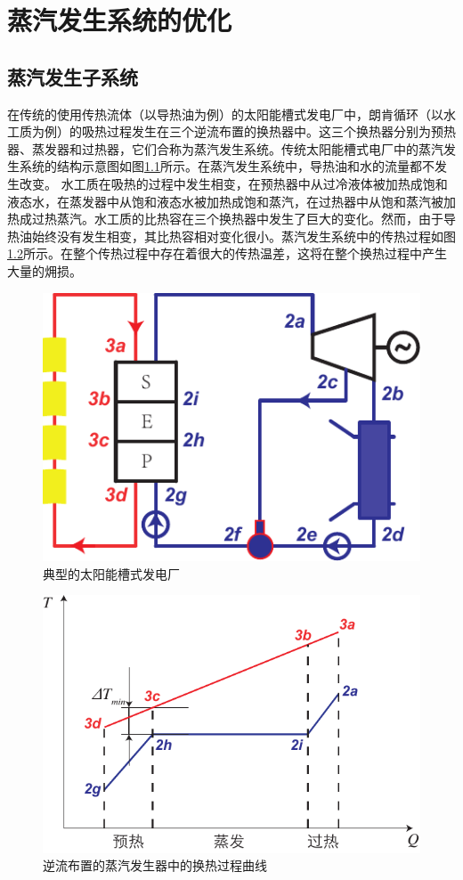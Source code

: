 \chapter{蒸汽发生系统的优化}
\label{cha:osgs}
\section{蒸汽发生子系统}

在传统的使用传热流体（以导热油为例）的太阳能槽式发电厂中，朗肯循环（以水工质为例）的吸热过程发生在三个逆流布置的换热器中。这三个换热器分别为预热器、蒸发器和过热器，它们合称为蒸汽发生系统。传统太阳能槽式电厂中的蒸汽发生系统的结构示意图如图\ref{fig:PTC}所示。在蒸汽发生系统中，导热油和水的流量都不发生改变。
水工质在吸热的过程中发生相变，在预热器中从过冷液体被加热成饱和液态水，在蒸发器中从饱和液态水被加热成饱和蒸汽，在过热器中从饱和蒸汽被加热成过热蒸汽。水工质的比热容在三个换热器中发生了巨大的变化。然而，由于导热油始终没有发生相变，其比热容相对变化很小。蒸汽发生系统中的传热过程如图\ref{fig:DeltaTmin}所示。在整个传热过程中存在着很大的传热温差，这将在整个换热过程中产生大量的㶲损。

\noindent \begin{figure}[htbp]
\begin{center}
	\includegraphics[width = 0.4\columnwidth]{fig/PTC}
	\caption{典型的太阳能槽式发电厂}
	\label{fig:PTC}
\end{center}
\end{figure}

\noindent \begin{figure}[htbp]
\begin{center}
	\includegraphics[width = 0.5\columnwidth]{fig/DeltaTmin}
	\caption{逆流布置的蒸汽发生器中的换热过程曲线}
	\label{fig:DeltaTmin}
\end{center}
\end{figure}

